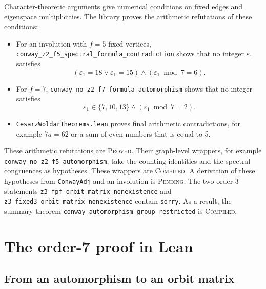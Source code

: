 \documentclass[pdflatex,sn-mathphys-num]{sn-jnl}
\theoremstyle{thmstyleone}
\theoremstyle{thmstyletwo}
\theoremstyle{thmstylethree}
\numberwithin{equation}{section}
\begin{document}
Character-theoretic arguments give numerical conditions on fixed edges and eigenspace multiplicities. The library proves the arithmetic refutations of these conditions:
\begin{itemize}
 \item For an involution with $f=5$ fixed vertices, \texttt{conway\_z2\_f5\_\allowbreak spectral\_\allowbreak formula\_\allowbreak contradiction} shows that no integer $\varepsilon_1$ satisfies
 \begin{equation}
  (\varepsilon_1 = 18 \lor \varepsilon_1 = 15) \land (\varepsilon_1 \bmod 7 = 6).
  \label{eq:f5_arith}
 \end{equation}
 \item For $f=7$, \texttt{conway\_no\_z2\_f7\_\allowbreak formula\_\allowbreak automorphism} shows that no integer satisfies
 \begin{equation}
  \varepsilon_1 \in \{7, 10, 13\} \land (\varepsilon_1 \bmod 7 = 2).
  \label{eq:f7_arith}
 \end{equation}
 \item \texttt{CesarzWoldarTheorems.lean} proves final arithmetic contradictions, for example $7a = 62$ or a sum of even numbers that is equal to 5.
\end{itemize}
These arithmetic refutations are \textsc{Proved}.
Their graph-level wrappers, for example \texttt{conway\_no\_z2\_f5\_\allowbreak automorphism}, take the counting identities and the spectral congruences as hypotheses. These wrappers are \textsc{Compiled}.
A derivation of these hypotheses from \texttt{ConwayAdj} and an involution is \textsc{Pending}.
The two order-3 statements \texttt{z3\_fpf\_orbit\_matrix\_nonexistence} and \texttt{z3\_fixed3\_orbit\_matrix\_nonexistence} contain \texttt{sorry}.
As a result, the summary theorem \texttt{conway\_automorphism\_\allowbreak group\_\allowbreak restricted} is \textsc{Compiled}.

\section{The order-7 proof in Lean}
\label{sec:z7}

\subsection{From an automorphism to an orbit matrix}
\label{sec:z7_reduction}
\end{document}
